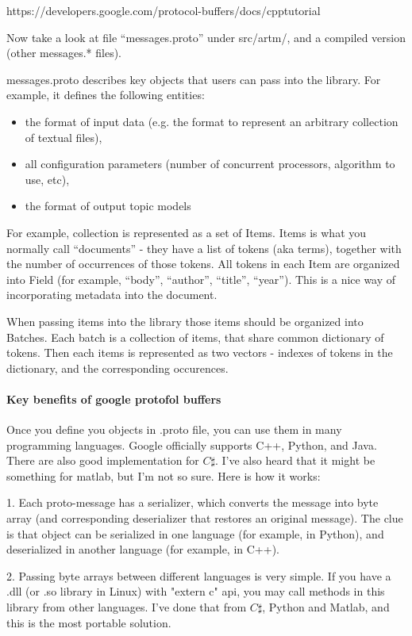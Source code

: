 \documentclass[11pt,a4paper,twoside]{report}
\begin{document}
https://developers.google.com/protocol-buffers/docs/cpptutorial

Now take a look at file ``messages.proto'' under src/artm/,
and a compiled version (other messages.* files).

messages.proto describes key objects that users can pass into the library.
For example, it defines the following entities:
\begin{itemize}
    \item the format of input data
        (e.g. the format to represent an arbitrary collection of textual files),
    \item all configuration parameters (number of concurrent processors, algorithm to use, etc),
    \item the format of output topic models
 \end{itemize}

For example, collection is represented as a set of Items.
Items is what you normally call ``documents'' - they have a list of tokens (aka terms),
together with the number of occurrences of those tokens.
All tokens in each Item are organized into Field (for example, ``body'', ``author'', ``title'', ``year'').
This is a nice way of incorporating metadata into the document.

When passing items into the library those items should be organized into Batches.
Each batch is a collection of items, that share common dictionary of tokens.
Then each items is represented as two vectors - indexes of tokens in the dictionary,
and the corresponding occurences.

\paragraph{Key benefits of google protofol buffers}

Once you define you objects in .proto file, you can use them in many programming languages.
Google officially supports C++, Python, and Java. There are also good implementation for $C\sharp$.
I've also heard that it might be something for matlab, but I'm not so sure. Here is how it works:

1. Each proto-message has a serializer, which converts the message into byte array
(and corresponding deserializer that restores an original message).
The clue is that object can be serialized in one language (for example, in Python),
and deserialized in another language (for example, in C++).

2. Passing byte arrays between different languages is very simple.
If you have a .dll (or .so library in Linux) with "extern c" api,
you may call methods in this library from other languages.
I've done that from $C\sharp$, Python and Matlab,
and this is the most portable solution.
\end{document}
